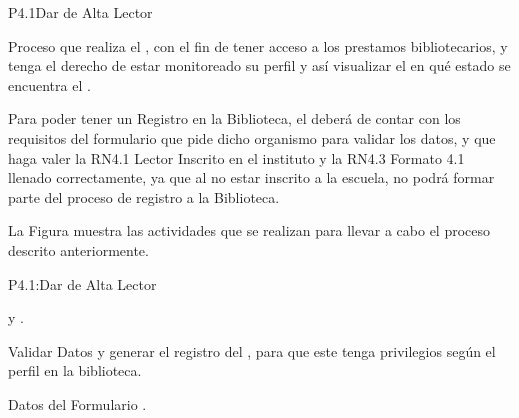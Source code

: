 




\begin{Proceso}{P4.1}{Dar de Alta Lector} {
  

Proceso que realiza el , con el fin de tener acceso a los prestamos bibliotecarios, y tenga el derecho de estar monitoreado su perfil y así visualizar el  en qué estado se encuentra el .
  
  
Para poder tener un Registro en la Biblioteca, el  deberá de contar con los requisitos del formulario que pide dicho organismo para validar los datos, y que haga valer la RN4.1 Lector Inscrito en el instituto y la RN4.3 Formato 4.1 llenado correctamente, ya que al no estar inscrito a la escuela, no podrá formar parte del proceso de registro a la Biblioteca.
  



  \noindent La Figura  muestra las actividades que se realizan para llevar a cabo el proceso descrito anteriormente.


} {P4.1:Dar de Alta Lector}


   { %
     y .
  }

   { %
    Validar Datos y generar el registro del , para que este tenga privilegios según el perfil en la biblioteca.
  }

   { %
  	\begin{UClist}
  		\UCli Datos del Formulario .
    \end {UClist}
  }
  

\end{Proceso}
